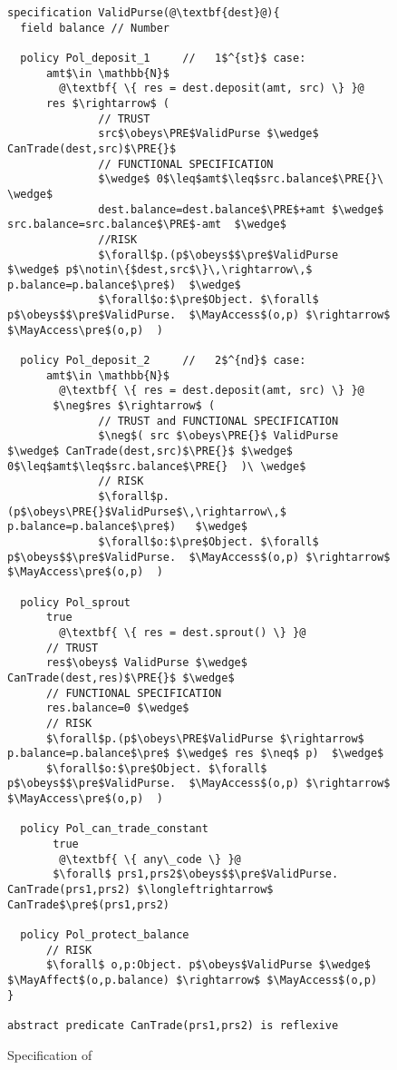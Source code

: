 \begin{figure*}
\begin{lstlisting}[escapechar=@]
specification ValidPurse(@\textbf{dest}@){
  field balance // Number

  policy Pol_deposit_1     //   1$^{st}$ case:
      amt$\in \mathbb{N}$
        @\textbf{ \{ res = dest.deposit(amt, src) \} }@
      res $\rightarrow$ (
              // TRUST
              src$\obeys\PRE$ValidPurse $\wedge$ CanTrade(dest,src)$\PRE{}$
              // FUNCTIONAL SPECIFICATION
              $\wedge$ 0$\leq$amt$\leq$src.balance$\PRE{}\ \wedge$
              dest.balance=dest.balance$\PRE$+amt $\wedge$ src.balance=src.balance$\PRE$-amt  $\wedge$
              //RISK
              $\forall$p.(p$\obeys$$\pre$ValidPurse $\wedge$ p$\notin\{$dest,src$\}\,\rightarrow\,$ p.balance=p.balance$\pre$)  $\wedge$
              $\forall$o:$\pre$Object. $\forall$ p$\obeys$$\pre$ValidPurse.  $\MayAccess$(o,p) $\rightarrow$ $\MayAccess\pre$(o,p)  )

  policy Pol_deposit_2     //   2$^{nd}$ case:
      amt$\in \mathbb{N}$
        @\textbf{ \{ res = dest.deposit(amt, src) \} }@
       $\neg$res $\rightarrow$ (
              // TRUST and FUNCTIONAL SPECIFICATION
              $\neg$( src $\obeys\PRE{}$ ValidPurse $\wedge$ CanTrade(dest,src)$\PRE{}$ $\wedge$ 0$\leq$amt$\leq$src.balance$\PRE{}  )\ \wedge$
              // RISK
              $\forall$p.(p$\obeys\PRE{}$ValidPurse$\,\rightarrow\,$ p.balance=p.balance$\pre$)   $\wedge$
              $\forall$o:$\pre$Object. $\forall$ p$\obeys$$\pre$ValidPurse.  $\MayAccess$(o,p) $\rightarrow$ $\MayAccess\pre$(o,p)  )

  policy Pol_sprout
      true
        @\textbf{ \{ res = dest.sprout() \} }@
      // TRUST
      res$\obeys$ ValidPurse $\wedge$  CanTrade(dest,res)$\PRE{}$ $\wedge$
      // FUNCTIONAL SPECIFICATION
      res.balance=0 $\wedge$
      // RISK
      $\forall$p.(p$\obeys\PRE$ValidPurse $\rightarrow$ p.balance=p.balance$\pre$ $\wedge$ res $\neq$ p)  $\wedge$
      $\forall$o:$\pre$Object. $\forall$ p$\obeys$$\pre$ValidPurse.  $\MayAccess$(o,p) $\rightarrow$ $\MayAccess\pre$(o,p)  )

  policy Pol_can_trade_constant
       true
        @\textbf{ \{ any\_code \} }@
       $\forall$ prs1,prs2$\obeys$$\pre$ValidPurse. CanTrade(prs1,prs2) $\longleftrightarrow$ CanTrade$\pre$(prs1,prs2) 

  policy Pol_protect_balance
      // RISK
      $\forall$ o,p:Object. p$\obeys$ValidPurse $\wedge$ $\MayAffect$(o,p.balance) $\rightarrow$ $\MayAccess$(o,p)
}

abstract predicate CanTrade(prs1,prs2) is reflexive

\end{lstlisting}
\caption{Specification of  }
\label{fig:ValidPurse}
\end{figure*}


